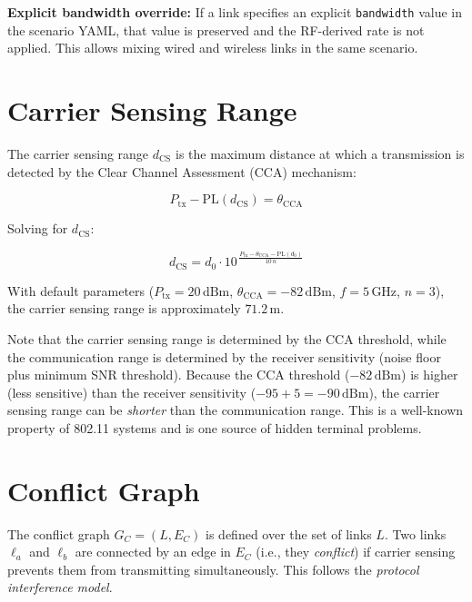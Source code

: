 \documentclass[11pt,letterpaper]{article}
\newcommand{\dBm}{\,\text{dBm}}
\newcommand{\GHz}{\,\text{GHz}}
\begin{document}
\textbf{Explicit bandwidth override:} If a link specifies an explicit
\texttt{bandwidth} value in the scenario YAML, that value is preserved and
the RF-derived rate is not applied.  This allows mixing wired and wireless
links in the same scenario.

\section{Carrier Sensing Range}
\label{sec:csrange}

The carrier sensing range $d_\text{CS}$ is the maximum distance at which a
transmission is detected by the Clear Channel Assessment (CCA) mechanism:

\begin{equation}
\label{eq:csrange}
P_\text{tx} - \text{PL}(d_\text{CS}) = \theta_\text{CCA}
\end{equation}

Solving for $d_\text{CS}$:

\begin{equation}
\label{eq:csrange_solve}
d_\text{CS} = d_0 \cdot 10^{\,\frac{P_\text{tx} - \theta_\text{CCA} - \text{PL}(d_0)}{10\,n}}
\end{equation}

With default parameters ($P_\text{tx} = 20\dBm$, $\theta_\text{CCA} =
-82\dBm$, $f = 5\GHz$, $n = 3$), the carrier sensing range is approximately
$71.2$\,m.

Note that the carrier sensing range is determined by the CCA threshold,
while the communication range is determined by the receiver sensitivity
(noise floor plus minimum SNR threshold).  Because the CCA threshold
($-82\dBm$) is higher (less sensitive) than the receiver sensitivity
($-95 + 5 = -90\dBm$), the carrier sensing range can be \emph{shorter}
than the communication range.  This is a well-known property of 802.11
systems and is one source of hidden terminal problems.

\section{Conflict Graph}
\label{sec:conflict}

The conflict graph $G_C = (L, E_C)$ is defined over the set of links $L$.
Two links $\ell_a$ and $\ell_b$ are connected by an edge in $E_C$ (i.e.,
they \emph{conflict}) if carrier sensing prevents them from transmitting
simultaneously.  This follows the \emph{protocol interference model}.
\end{document}
